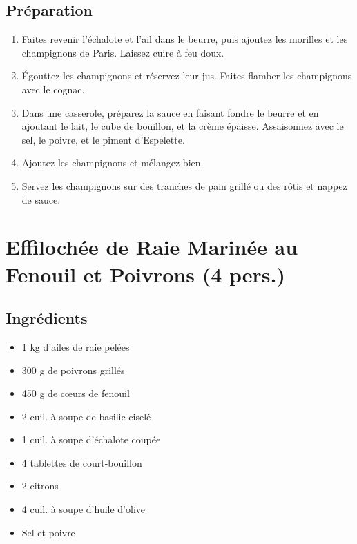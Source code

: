 \subsection{Préparation}\label{pruxe9paration-1}

\begin{enumerate}
\def\labelenumi{\arabic{enumi}.}

\item
  Faites revenir l'échalote et l'ail dans le beurre, puis ajoutez les
  morilles et les champignons de Paris. Laissez cuire à feu doux.
\item
  Égouttez les champignons et réservez leur jus. Faites flamber les
  champignons avec le cognac.
\item
  Dans une casserole, préparez la sauce en faisant fondre le beurre et
  en ajoutant le lait, le cube de bouillon, et la crème épaisse.
  Assaisonnez avec le sel, le poivre, et le piment d'Espelette.
\item
  Ajoutez les champignons et mélangez bien.
\item
  Servez les champignons sur des tranches de pain grillé ou des rôtis et
  nappez de sauce.
\end{enumerate}

\section{Effilochée de Raie Marinée au Fenouil et Poivrons (4
pers.)}\label{effilochuxe9e-de-raie-marinuxe9e-au-fenouil-et-poivrons-4-pers.}

\subsection{Ingrédients}\label{ingruxe9dients-5}

\begin{itemize}

\item
  1 kg d'ailes de raie pelées
\item
  300 g de poivrons grillés
\item
  450 g de cœurs de fenouil
\item
  2 cuil. à soupe de basilic ciselé
\item
  1 cuil. à soupe d'échalote coupée
\item
  4 tablettes de court-bouillon
\item
  2 citrons
\item
  4 cuil. à soupe d'huile d'olive
\item
  Sel et poivre
\end{itemize}

